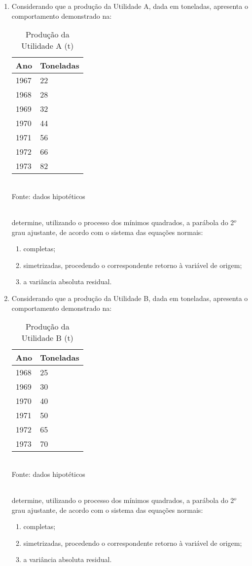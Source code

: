 \begin{enumerate}[resume]
\item Considerando que a produção da Utilidade A, dada em toneladas, apresenta o comportamento demonstrado na:
	\begin{table}[!htb]
	\centering
	\caption{Produção da Utilidade A (t)}
	\vspace{0.5cm}
	\begin{tabular}{ll}
	Ano & Toneladas \\
	\hline 
	1967 & 22 \\
	1968 & 28 \\
	1969 & 32 \\
	1970 & 44 \\	
	1971 & 56 \\	
	1972 & 66 \\
	1973 & 82 \\
	\end{tabular}\\
	Fonte: dados hipotéticos
	\end{table}
	\\
	determine, utilizando o processo dos mínimos quadrados, a parábola do 2$^o$ grau ajustante, de acordo com o sistema das equações normais:
	\begin{enumerate}
	\item completas;
	\item simetrizadas, procedendo o correspondente retorno à variável de origem;
	\item a variância absoluta residual.	
	\end{enumerate}			

\item Considerando que a produção da Utilidade B, dada em toneladas, apresenta o comportamento demonstrado na:
	\begin{table}[!htb]
	\centering
	\caption{Produção da Utilidade B (t)}
	\vspace{0.5cm}
	\begin{tabular}{ll}
	Ano & Toneladas \\
	\hline 
	1968 & 25 \\
	1969 & 30 \\
	1970 & 40 \\	
	1971 & 50 \\	
	1972 & 65 \\
	1973 & 70 \\
	\end{tabular}\\
	Fonte: dados hipotéticos
	\end{table}
	\\
	determine, utilizando o processo dos mínimos quadrados, a parábola do 2$^o$ grau ajustante, de acordo com o sistema das equações normais:
	\begin{enumerate}
	\item completas;
	\item simetrizadas, procedendo o correspondente retorno à variável de origem;
	\item a variância absoluta residual.	
	\end{enumerate}			


\end{enumerate}
